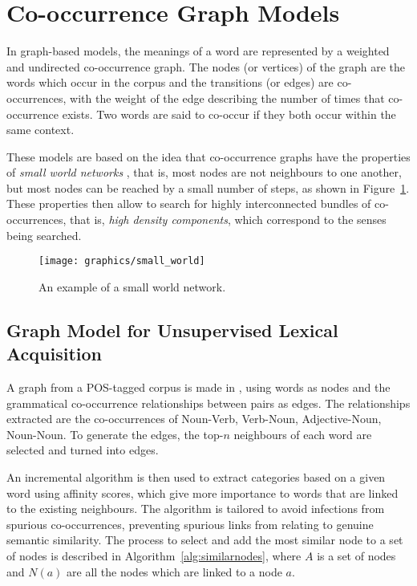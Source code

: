 \section{Co-occurrence Graph Models}
\label{sec:co-occurrence}

In graph-based models, the meanings of a word are represented by a weighted
and undirected co-occurrence graph. The nodes (or vertices) of the graph are the
words which occur in the corpus and the transitions (or edges) are 
co-occurrences, with the weight of the edge describing the number of times that 
co-occurrence exists. Two words are said to co-occur if they both occur within 
the same context.

These models are based on the idea that co-occurrence graphs have the properties
of \textit{small world networks} \citep{veronis2004hyperlex}, that is, most 
nodes are not neighbours to one another, but most nodes can be reached by a 
small number of steps, as shown in Figure~\ref{fig:small-world}. These 
properties then allow to search for highly interconnected bundles of 
co-occurrences, that is, \textit{high density components}, which correspond to 
the senses being searched.

\begin{figure}[ht]
 \caption{An example of a small world network.}
 \label{fig:small-world}
 \centering
 \texttt{[image: graphics/small\_world]}
\end{figure}

\subsection{Graph Model for Unsupervised Lexical Acquisition}

A graph from a \ac{POS}-tagged corpus is made in \citep{widdows2002graph}, using
words as nodes and the grammatical co-occurrence relationships between pairs as
edges. The relationships extracted are the co-occurrences of Noun-Verb,
Verb-Noun, Adjective-Noun, Noun-Noun. To generate the edges, the top-$n$
neighbours of each word are selected and turned into edges.

An incremental algorithm is then used to extract categories based on a given
word using affinity scores, which give more importance to words that are linked
to the existing neighbours. The algorithm is tailored to avoid infections from
spurious co-occurrences, preventing spurious links from relating to genuine
semantic similarity. The process to select and add the most similar node to a
set of nodes is described in Algorithm~\ref{alg:similarnodes}, where $A$ is a
set of nodes and $N(a)$ are all the nodes which are linked to a node $a$.

